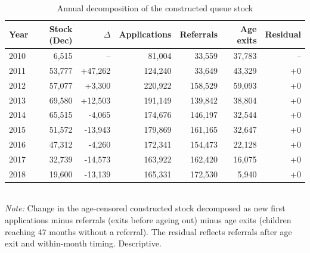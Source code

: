 \begin{table}[htbp]\centering
\caption{Annual decomposition of the constructed queue stock}
\label{tab:C5_decomposicao}
\small
\setlength{\tabcolsep}{4pt}
\begin{tabular}{lrrrrrr}
\toprule
Year & Stock (Dec) & $\Delta$ & Applications & Referrals & Age exits & Residual \\
\midrule
2010 & 6,515 & -- & 81,004 & 33,559 & 37,783 & -- \\
2011 & 53,777 & +47,262 & 124,240 & 33,649 & 43,329 & +0 \\
2012 & 57,077 & +3,300 & 220,922 & 158,529 & 59,093 & +0 \\
2013 & 69,580 & +12,503 & 191,149 & 139,842 & 38,804 & +0 \\
2014 & 65,515 & -4,065 & 174,676 & 146,197 & 32,544 & +0 \\
2015 & 51,572 & -13,943 & 179,869 & 161,165 & 32,647 & +0 \\
2016 & 47,312 & -4,260 & 172,341 & 154,473 & 22,128 & +0 \\
2017 & 32,739 & -14,573 & 163,922 & 162,420 & 16,075 & +0 \\
2018 & 19,600 & -13,139 & 165,331 & 172,530 & 5,940 & +0 \\
\bottomrule
\end{tabular}
\\[3pt]{\footnotesize \textit{Note:} Change in the age-censored constructed stock decomposed as new first applications minus referrals (exits before ageing out) minus age exits (children reaching 47 months without a referral). The residual reflects referrals after age exit and within-month timing. Descriptive.}
\end{table}
